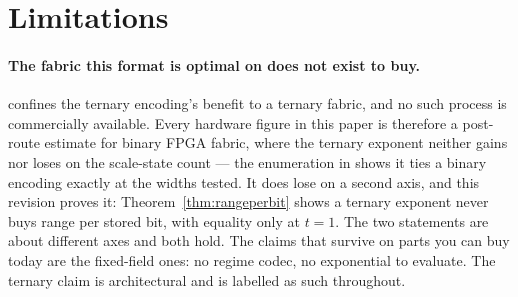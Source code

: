 \section{Limitations}\label{sec:limitations-anchor}\label{sec:limits}



\paragraph{The fabric this format is optimal on does not exist to buy.}
 confines the ternary encoding's benefit to a ternary
fabric, and no such process is commercially available. Every hardware figure in
this paper is therefore a post-route estimate for binary FPGA fabric, where the
ternary exponent neither gains nor loses on the scale-state count --- the
enumeration in  shows it ties a binary encoding
exactly at the widths tested. It does lose on a second axis, and this revision
proves it: Theorem~\ref{thm:rangeperbit} shows a ternary exponent never buys range
per stored bit, with equality only at $t=1$. The two statements are about
different axes and both hold. The claims that survive on parts you can buy today are the fixed-field
ones: no regime codec, no exponential to
evaluate. The ternary claim is architectural and is labelled as such throughout.

